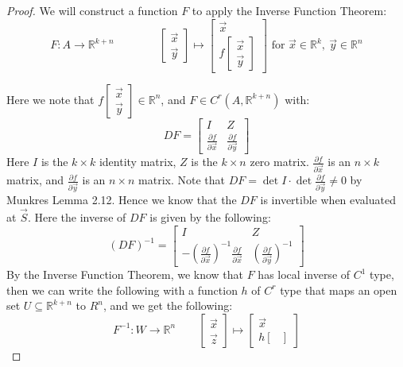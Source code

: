 \documentclass[15pt]{book}
\theoremstyle{break}
\theoremstyle{break}
\newcommand{\R}{\mathbb{R}}
\begin{document}
\begin{proof}
We will construct a function $F$ to apply the Inverse Function Theorem: $$F:A \to \R^{k+n}\qquad\qquad \begin{bmatrix}
\vec{x}\\\vec{y}
\end{bmatrix} \mapsto \begin{bmatrix}
\vec{x}\\ f\begin{bmatrix}
\vec{x}\\\vec{y}
\end{bmatrix}
\end{bmatrix} \text{\ \ \  for }\vec{x}\in \R^k,\ \vec{y}\in \R^n$$ 

Here we note that $f\begin{bmatrix} \vec{x}\\\vec{y} \end{bmatrix} \in \R^n$, and $F \in C^r(A,\R^{k+n})$ with:
$$DF = \begin{bmatrix}
I & Z \\ 
\frac{\partial f}{\partial \vec{x}}& \frac{\partial f }{\partial \vec{y}}
\end{bmatrix}$$
Here $I$ is the ${k \times k}$ identity matrix, $Z$ is the ${k \times n}$ zero matrix. $\frac{\partial f}{\partial \vec{x}}$ is an ${n \times k}$ matrix, and $\frac{\partial f }{\partial \vec{y}}$ is an ${n \times n}$ matrix. Note that $DF = \det I \cdot \det \frac{\partial f}{\partial \vec{y}} \neq 0$ by Munkres Lemma 2.12. Hence we know that the $DF$ is invertible when evaluated at $\vec{S}$. Here the inverse of $DF$ is given by the following:
$$(DF)^{-1} = \begin{bmatrix}
I & Z \\ -\left(\frac{\partial f}{\partial \vec{x}}\right)^{-1}\frac{\partial f}{\partial \vec{x}} & \left(\frac{\partial f}{\partial \vec{y}}\right)^{-1}
\end{bmatrix}$$
By the Inverse Function Theorem, we know that $F$ has local inverse of $C^{1}$ type, then we can write the following with a function $h$ of $C^r$ type that maps an open set $U\subseteq \R^{k+n}$ to $R^n$, and we get the following:
$$F^{-1}: W \to \R^n \qquad \begin{bmatrix}
\vec{x}\\\vec{z}
\end{bmatrix}  \mapsto \begin{bmatrix}
\vec{x} \\ h\begin{bmatrix}

\end{bmatrix}
\end{bmatrix}$$
\end{proof}
\end{document}
